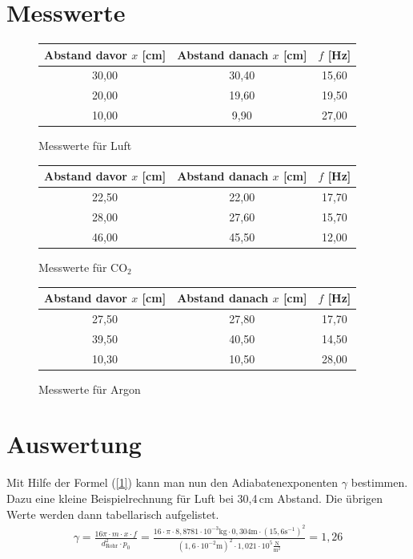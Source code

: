 \documentclass[fontsize=12pt]{scrartcl}
\begin{document}
\section{ Messwerte}
\begin{figure}[H]
\centering
\caption{Messwerte für Luft}
\begin{tabular}{|c|c|c|} \hline
Abstand davor $x$ [cm]	& Abstand danach $x$ [cm] & $f$ [Hz]\\ \hline
30,00&	30,40&	15,60 \\ \hline
20,00&	19,60&	19,50\\ \hline
10,00&	9,90&	27,00\\ \hline
\end{tabular}				 
\end{figure}
\begin{figure}[H]
\centering
\caption{Messwerte für CO$_2$}
\begin{tabular}{|c|c|c|} \hline
Abstand davor $x$ [cm]	& Abstand danach $x$ [cm] & $f$ [Hz]\\ \hline
22,50&	22,00&	17,70\\ \hline
28,00&	27,60&	15,70\\ \hline
46,00&	45,50&	12,00\\ \hline
\end{tabular}				 
\end{figure}
\begin{figure}[H]
\centering
\caption{Messwerte für Argon}
\begin{tabular}{|c|c|c|} \hline
Abstand davor $x$ [cm]	& Abstand danach $x$ [cm] & $f$ [Hz]\\ \hline
27,50&	27,80&	17,70\\ \hline
39,50&	40,50&	14,50\\ \hline
10,30&	10,50&	28,00\\ \hline
\end{tabular}				 
\end{figure}
\newpage

\section{ Auswertung}

Mit Hilfe der Formel (\ref{1}) kann man nun den Adiabatenexponenten $\gamma$ bestimmen. Dazu eine kleine Beispielrechnung für Luft bei 30,4\,cm Abstand. Die übrigen Werte werden dann tabellarisch aufgelistet.
\begin{align*}
\gamma = \frac{16\pi \cdot m \cdot x \cdot f}{d_{\text{Rohr}}^2 \cdot p_0} = \frac{16\cdot\pi \cdot 8,8781 \cdot 10^{-3}\text{kg} \cdot 0,304\text{m} \cdot (15,6 \text{s}^{-1})^2}{(1,6 \cdot 10^{-2}\text{m})^2 \cdot 1,021 \cdot 10^5 \frac{\text{N}}{\text{m}^2}} = 1,26
\end{align*}
\end{document}
